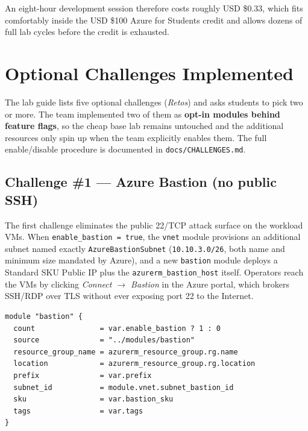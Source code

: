 \documentclass[10pt,a4paper,twocolumn]{article}
\begin{document}
An eight-hour development session therefore costs roughly USD \$0.33,
which fits comfortably inside the USD \$100 Azure for Students credit
and allows dozens of full lab cycles before the credit is exhausted.

\section{Optional Challenges Implemented}

The lab guide lists five optional challenges (\emph{Retos}) and asks
students to pick two or more. The team implemented two of them as
\textbf{opt-in modules behind feature flags}, so the cheap base lab
remains untouched and the additional resources only spin up when the
team explicitly enables them. The full enable/disable procedure is
documented in \texttt{docs/CHALLENGES.md}.

\subsection{Challenge \#1 --- Azure Bastion (no public SSH)}

The first challenge eliminates the public 22/TCP attack surface on the
workload VMs. When \texttt{enable\_bastion = true}, the \texttt{vnet}
module provisions an additional subnet named exactly
\texttt{AzureBastionSubnet} (\texttt{10.10.3.0/26}, both name and
minimum size mandated by Azure), and a new \texttt{bastion} module
deploys a Standard SKU Public IP plus the
\texttt{azurerm\_bastion\_host} itself. Operators reach the VMs by
clicking \emph{Connect $\rightarrow$ Bastion} in the Azure portal, which
brokers SSH/RDP over TLS without ever exposing port 22 to the Internet.

\begin{lstlisting}[style=hclcode, caption={Bastion module wired through a feature flag (\texttt{infra/main.tf})}]
module "bastion" {
  count               = var.enable_bastion ? 1 : 0
  source              = "../modules/bastion"
  resource_group_name = azurerm_resource_group.rg.name
  location            = azurerm_resource_group.rg.location
  prefix              = var.prefix
  subnet_id           = module.vnet.subnet_bastion_id
  sku                 = var.bastion_sku
  tags                = var.tags
}
\end{lstlisting}
\end{document}
